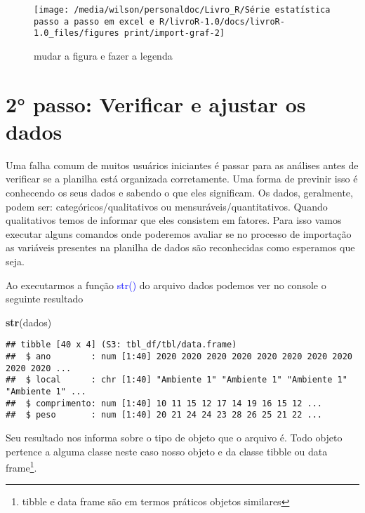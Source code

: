 \documentclass[titlepage, oneside, openany, a4paper]{book}
\newenvironment{Shaded}{\begin{snugshade}}{\end{snugshade}}
\newcommand{\KeywordTok}[1]{\textcolor[rgb]{0.13,0.29,0.53}{\textbf{#1}}}
\newcommand{\NormalTok}[1]{#1}
\begin{document}
\begin{figure}

{\centering \texttt{[image: /media/wilson/personaldoc/Livro\_R/Série estatística passo a passo em excel e R/livroR-1.0/docs/livroR-1.0\_files/figures print/import-graf-2]} 

}

\caption{mudar a figura e fazer a legenda}\label{fig:import-graf-2}
\end{figure}

\hypertarget{passo-verificar-e-ajustar-os-dados}{%
\section{2° passo: Verificar e ajustar os dados}\label{passo-verificar-e-ajustar-os-dados}}

Uma falha comum de muitos usuários iniciantes é passar para as análises antes de verificar se a planilha está organizada corretamente. Uma forma de previnir isso é conhecendo os seus dados e sabendo o que eles significam. Os dados, geralmente, podem ser: categóricos/qualitativos ou mensuráveis/quantitativos. Quando qualitativos temos de informar que eles consistem em fatores. Para isso vamos executar alguns comandos onde poderemos avaliar se no processo de importação as variáveis presentes na planilha de dados são reconhecidas como esperamos que seja.

Ao executarmos a função \textcolor{blue}{str()} do arquivo dados podemos ver no console o seguinte resultado

\begin{Shaded}
\begin{Highlighting}[]
\KeywordTok{str}\NormalTok{(dados)}
\end{Highlighting}
\end{Shaded}

\begin{verbatim}
## tibble [40 x 4] (S3: tbl_df/tbl/data.frame)
##  $ ano        : num [1:40] 2020 2020 2020 2020 2020 2020 2020 2020 2020 2020 ...
##  $ local      : chr [1:40] "Ambiente 1" "Ambiente 1" "Ambiente 1" "Ambiente 1" ...
##  $ comprimento: num [1:40] 10 11 15 12 17 14 19 16 15 12 ...
##  $ peso       : num [1:40] 20 21 24 24 23 28 26 25 21 22 ...
\end{verbatim}

Seu resultado nos informa sobre o tipo de objeto que o arquivo é. Todo objeto pertence a alguma classe neste caso nosso objeto e da classe tibble ou data frame\footnote{tibble e data frame são em termos práticos objetos similares}.
\end{document}
